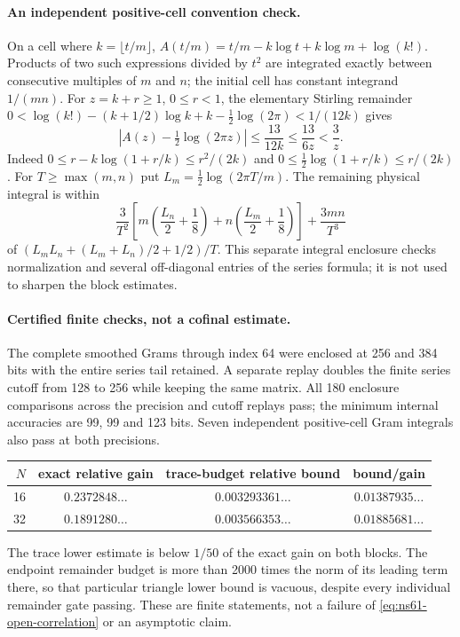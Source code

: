 \documentclass[11pt]{article}
\theoremstyle{remark}
\begin{document}
\paragraph{An independent positive-cell convention check.}
On a cell where $k=\lfloor t/m\rfloor$,
$A(t/m)=t/m-k\log t+k\log m+\log(k!)$.
Products of two such expressions divided by $t^2$ are integrated
exactly between consecutive multiples of $m$ and $n$; the initial
cell has constant integrand $1/(mn)$.
For $z=k+r\geq1$, $0\leq r<1$, the elementary Stirling remainder
\cite[\S5.11]{DLMFGammaBounds}
$0<\log(k!)-(k+1/2)\log k+k-\tfrac12\log(2\pi)<1/(12k)$
gives
\[
 \left|A(z)-\tfrac12\log(2\pi z)\right|
 \leq\frac{13}{12k}\leq\frac{13}{6z}<\frac3z.
\]
Indeed $0\leq r-k\log(1+r/k)\leq r^2/(2k)$ and
$0\leq\tfrac12\log(1+r/k)\leq r/(2k)$.
For $T\geq\max(m,n)$ put $L_m=\tfrac12\log(2\pi T/m)$.
The remaining physical integral is within
\[
 \frac3{T^2}\left[m\left(\frac{L_n}2+\frac18\right)
                 +n\left(\frac{L_m}2+\frac18\right)\right]
            +\frac{3mn}{T^3}
\]
of $(L_mL_n+(L_m+L_n)/2+1/2)/T$.
This separate integral enclosure checks normalization and several
off-diagonal entries of the series formula; it is not used to sharpen
the block estimates.

\paragraph{Certified finite checks, not a cofinal estimate.}
The complete smoothed Grams through index 64 were enclosed at 256 and
384 bits with the entire series tail retained. A separate replay doubles
the finite series cutoff from 128 to 256 while keeping the same matrix.
All 180 enclosure comparisons across the precision and cutoff replays pass; the minimum internal accuracies are
99, 99 and 123 bits. Seven independent positive-cell Gram integrals
also pass at both precisions.
\begin{center}
\begin{tabular}{rccc}
\toprule
$N$ & exact relative gain & trace-budget relative bound & bound/gain\\
\midrule
16 & $0.2372848\ldots$ & $0.003293361\ldots$ & $0.01387935\ldots$\\
32 & $0.1891280\ldots$ & $0.003566353\ldots$ & $0.01885681\ldots$\\
\bottomrule
\end{tabular}
\end{center}
The trace lower estimate is below $1/50$ of the exact gain on both
blocks. The endpoint remainder budget is more than 2000 times the norm
of its leading term there, so that particular triangle lower bound is
vacuous, despite every individual remainder gate passing.
These are finite statements, not a failure of
\eqref{eq:ns61-open-correlation} or an asymptotic claim.
\end{document}

